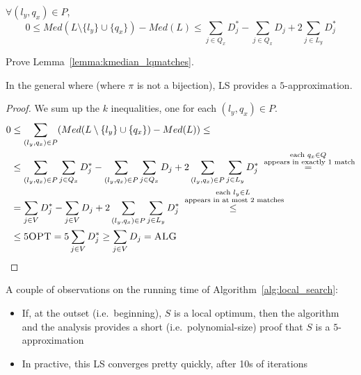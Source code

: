     \begin{lemma}\label{lemma:kmedian_lqmatches}
        $\forall (l_y, q_x) \in P$,
        \[ 0 \leq Med(L \setminus \{l_y\} \cup \{q_x\}) - Med(L) \leq \sum_{j \in Q_x} D_j^* - \sum_{j \in Q_x} D_j + 2 \sum_{j \in L_y} D_j^* \]
    \end{lemma}

    \begin{exercise}
        Prove Lemma~\ref{lemma:kmedian_lqmatches}.
    \end{exercise}

    \begin{theorem}
        In the general where (where $\pi$ is not a bijection), LS provides a $5$-approximation.
    \end{theorem}

    \begin{proof}
        We sum up the $k$ inequalities, one for each $(l_y, q_x) \in P$.
        \begin{equation*}
            \begin{split}
                0 &\leq \sum_{(l_y, q_x) \in P} (Med(L \setminus \{l_y\} \cup \{q_x\}) - Med(L)) \leq\\
                &\leq \sum_{(l_y,q_x) \in P} \sum_{j \in Q_x} D_j^* - \sum_{(l_y,q_x) \in P} \sum_{j \in Q_x} D_j + 2 \sum_{(l_y,q_x) \in P} \sum_{j \in L_y} D_j^* \overset{\substack{\text{each } q_x \in Q\\\text{ appears in exactly 1 match}}}{=}\\
                &= \sum_{j \in V} D_j^* - \sum_{j \in V} D_j + 2 \sum_{(l_y,q_x) \in P} \sum_{j \in L_y} D_j^* \overset{\substack{\text{each } l_y \in L\\ \text{ appears in at most 2 matches}}}{\leq}\\
                &\leq 5 \textsc{OPT} = 5 \sum_{j \in V} D_j^* \geq \sum_{j \in V} D_j = \textsc{ALG}
            \end{split}
        \end{equation*}
    \end{proof}

    A couple of observations on the running time of Algorithm~\ref{alg:local_search}:
    \begin{itemize}
        \item If, at the outset (i.e.~beginning), $S$ is a local optimum, then the algorithm and the analysis provides a short (i.e.~polynomial-size) proof that $S$ is a $5$-approximation
        \item In practive, this LS converges pretty quickly, after 10s of iterations
    \end{itemize}

